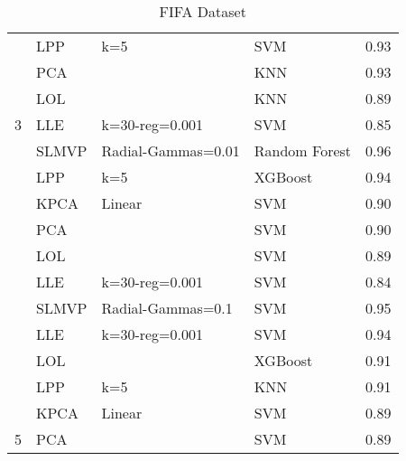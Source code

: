 \begin{table}
\begin{tabular}{llllr}
                                                & LPP            & k=5                & SVM           & 0.93     \\
                                                & PCA            &                    & KNN           & 0.93     \\
                                                & LOL            &                    & KNN           & 0.89     \\
        \multirow{-6}{*}{3}                     & LLE            & k=30-reg=0.001     & SVM           & 0.85     \\
        \rowcolor{lightgray}                    & SLMVP          & Radial-Gammas=0.01 & Random Forest & 0.96     \\
        \rowcolor{lightgray}                    & LPP            & k=5                & XGBoost       & 0.94     \\
        \rowcolor{lightgray}                    & KPCA           & Linear             & SVM           & 0.90     \\
        \rowcolor{lightgray}                    & PCA            &                    & SVM           & 0.90     \\
        \rowcolor{lightgray}                    & LOL            &                    & SVM           & 0.89     \\
        \rowcolor{lightgray}\multirow{-6}{*}{4} & LLE            & k=30-reg=0.001     & SVM           & 0.84     \\
                                                & SLMVP          & Radial-Gammas=0.1  & SVM           & 0.95     \\
                                                & LLE            & k=30-reg=0.001     & SVM           & 0.94     \\
                                                & LOL            &                    & XGBoost       & 0.91     \\
                                                & LPP            & k=5                & KNN           & 0.91     \\
                                                & KPCA           & Linear             & SVM           & 0.89     \\
        \multirow{-6}{*}{5}                     & PCA            &                    & SVM           & 0.89     \\
        \bottomrule
    \end{tabular}

    \caption{FIFA Dataset}
    \label{annex-tab:fifa-dataset}
\end{table}

